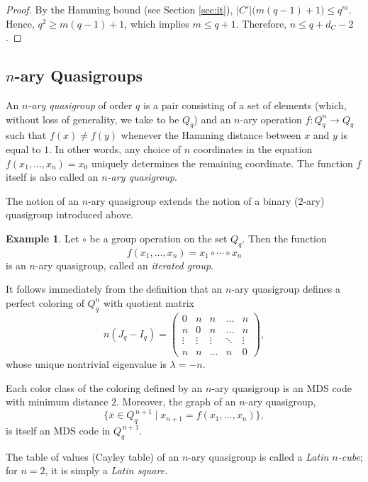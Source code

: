 \documentclass[11pt]{article}
\theoremstyle{definition}
\newtheorem{example}{Example}[section]
\begin{document}
{{{\begin{proof}
By the Hamming bound (see Section \ref{sec:it}),
$|C'|\bigl(m(q-1)+1\bigr)\le q^m$.
Hence,
$q^2\ge m(q-1)+1$,
which implies $m\le q+1$. Therefore,
$
n\le q+d_C-2$.
\end{proof}




\subsection{$n$-ary Quasigroups}

An {\sl $n$-ary quasigroup} of order $q$ is a pair consisting of a set
of elements (which, without loss of generality, we take to be $Q_q$)
and an $n$-ary operation
$f:Q_q^n\rightarrow Q_q $
such that
$f(x)\neq f(y)$
whenever the Hamming  distance between $x$ and $y$ is equal to $1$.
In other words, any choice of $n$ coordinates in the equation $f(x_1,\dots,x_n)=x_0$
uniquely determines the remaining coordinate. 
The function $f$ itself is also called an
{\sl $n$-ary quasigroup}.

The notion of an $n$-ary quasigroup extends the notion of a binary
($2$-ary) quasigroup introduced above.

\begin{example}
Let $\circ$ be a group operation on the set $Q_q$. Then the function
\[
f(x_1,\dots,x_n)=x_1\circ\cdots\circ x_n
\]
is an $n$-ary quasigroup, called an {\sl iterated group}.
\end{example}

It follows immediately from the definition that an $n$-ary quasigroup
defines a perfect coloring of $Q^n_q$ with quotient matrix
\[
n(J_q-I_q)=
\left(\begin{array}{ccccc}
0 & n & n & \dots & n\\
n & 0 & n & \dots & n\\
\vdots & \vdots & \vdots & \ddots & \vdots\\
n & n & \dots & n & 0
\end{array}\right),
\]
whose unique nontrivial eigenvalue is $\lambda=-n$.

Each color class of the coloring defined by an $n$-ary quasigroup is
an MDS code with minimum distance $2$. Moreover, the graph of an
$n$-ary quasigroup,
\[
\{\bar{x}\in Q_q^{\,n+1}\mid
x_{n+1}=f(x_1,\dots,x_n)\},
\]
is itself an MDS code in $Q_q^{\,n+1}$.

The table of values (Cayley table) of an $n$-ary quasigroup is called
a {\sl Latin $n$-cube}; for $n=2$, it is simply a {\sl Latin square}.

}}}
\end{document}
